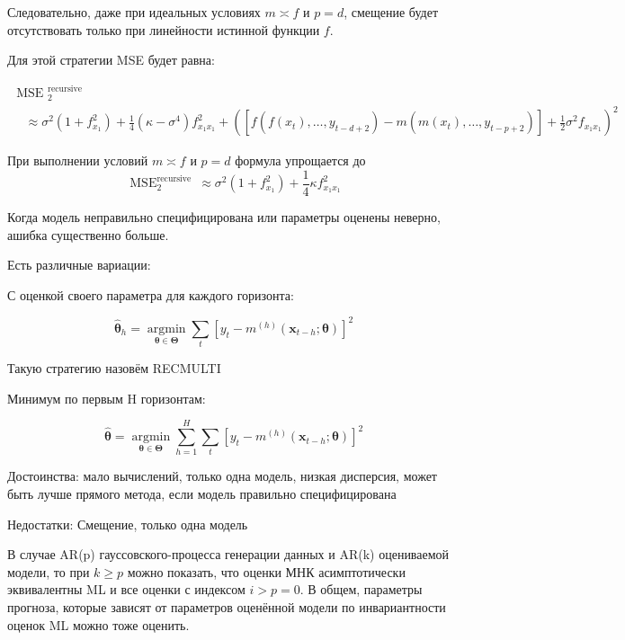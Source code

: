 \documentclass[a4paper,12pt]{article}
\begin{document}
 Следовательно, даже при идеальных условиях  $ m \asymp f $ и $ p = d $, смещение будет отсутствовать только при линейности истинной функции $ f $. 
 
 Для этой стратегии MSE будет равна:
 
\[
\begin{array}{l}{\text { MSE }_{2}^{\text {recursive }}} \\ {\quad \approx \sigma^{2}\left(1+f_{x_{1}}^{2}\right)+\frac{1}{4}\left(\kappa-\sigma^{4}\right) f_{x_{1} x_{1}}^{2}+\left(\left[f\left(f\left(x_{t}\right), \ldots, y_{t-d+2}\right)-m\left(m\left(x_{t}\right), \ldots, y_{t-p+2}\right)\right]+\frac{1}{2} \sigma^{2} f_{x_{1} x_{1}}\right)^{2}}\end{array}
\]

При выполнении условий $ m \asymp f $ и $ p = d $ формула упрощается до \[
\operatorname{MSE}_{2}^{\text {recursive }} \approx \sigma^{2}\left(1+f_{x_{1}}^{2}\right)+\frac{1}{4} \kappa f_{x_{1} x_{1}}^{2}
\]

Когда модель неправильно специфицирована или параметры оценены неверно, ашибка существенно больше. 

Есть различные вариации:

С оценкой своего параметра для каждого горизонта:

\[
\hat{\boldsymbol{\theta}}_{h}=\underset{\boldsymbol{\theta} \in \boldsymbol{\Theta}}{\operatorname{argmin}} \sum_{t}\left[y_{t}-m^{(h)}\left(\boldsymbol{x}_{t-h} ; \boldsymbol{\theta}\right)\right]^{2}
\]

Такую стратегию назовём RECMULTI

Минимум по первым H горизонтам:

\[
\hat{\boldsymbol{\theta}}=\underset{\boldsymbol{\theta} \in \boldsymbol{\Theta}}{\operatorname{argmin}} \sum_{h=1}^{H} \sum_{t}\left[y_{t}-m^{(h)}\left(\boldsymbol{x}_{t-h} ; \boldsymbol{\theta}\right)\right]^{2}
\]

Достоинства: мало вычислений, только одна модель, низкая дисперсия, может быть лучше прямого метода, если модель правильно специфицирована

Недостатки: Смещение, только одна модель


В случае AR(p) гауссовского-процесса генерации данных и AR(k) оцениваемой модели, то при $ k \ge p $ можно показать, что оценки МНК асимптотически эквивалентны ML и все оценки с индексом $ i > p = 0$. В общем, параметры прогноза, которые зависят от параметров оценённой модели по инвариантности оценок ML можно тоже оценить.
\end{document}
